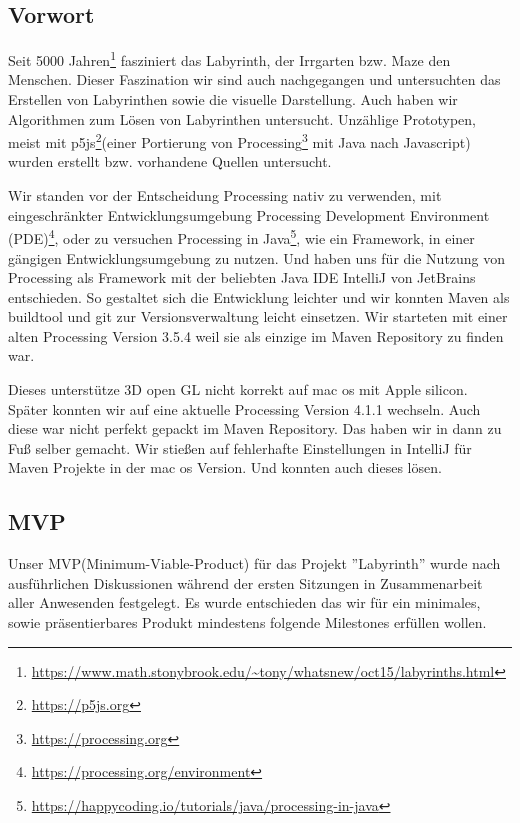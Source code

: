 
\subsection{Vorwort}\label{subsec:Vorwort}

Seit 5000 Jahren\footnote{\url{https://www.math.stonybrook.edu/~tony/whatsnew/oct15/labyrinths.html}} fasziniert das Labyrinth, der Irrgarten bzw. Maze den Menschen. Dieser Faszination wir sind auch nachgegangen und untersuchten das Erstellen von Labyrinthen sowie die visuelle Darstellung. Auch haben wir Algorithmen zum Lösen von Labyrinthen untersucht. Unzählige Prototypen, meist mit p5js\footnote{\url{https://p5js.org}}(einer Portierung von Processing\footnote{\url{https://processing.org}}  mit Java nach Javascript)  wurden erstellt bzw.  vorhandene Quellen untersucht.

	Wir standen vor der Entscheidung Processing nativ zu verwenden, mit eingeschränkter Entwicklungsumgebung Processing Development Environment (PDE)\footnote{\url{https://processing.org/environment}},  oder zu versuchen Processing in Java\footnote{\url{https://happycoding.io/tutorials/java/processing-in-java}}, wie ein Framework, in einer gängigen Entwicklungsumgebung zu nutzen. Und haben uns für die Nutzung von Processing als Framework mit der beliebten Java IDE IntelliJ von JetBrains entschieden. So gestaltet sich die Entwicklung leichter und wir konnten Maven als buildtool und git zur Versionsverwaltung leicht einsetzen. Wir starteten mit einer alten Processing Version 3.5.4 weil sie als einzige im Maven Repository zu finden war. 

	Dieses unterstütze 3D open GL nicht korrekt auf mac os mit Apple silicon. Später konnten wir auf eine aktuelle Processing Version 4.1.1 wechseln. Auch diese war nicht perfekt gepackt im Maven Repository. Das haben wir in dann zu Fuß selber gemacht. Wir stießen auf fehlerhafte Einstellungen in IntelliJ für Maven Projekte in der mac os Version. Und konnten auch dieses lösen.

\subsection{MVP}\label{subsec:mvp}
	Unser MVP(Minimum-Viable-Product) für das Projekt ''Labyrinth''  wurde nach ausführlichen Diskussionen während der ersten Sitzungen in Zusammenarbeit aller Anwesenden festgelegt. Es wurde entschieden das wir für ein minimales, sowie präsentierbares Produkt mindestens folgende Milestones erfüllen wollen.
	
